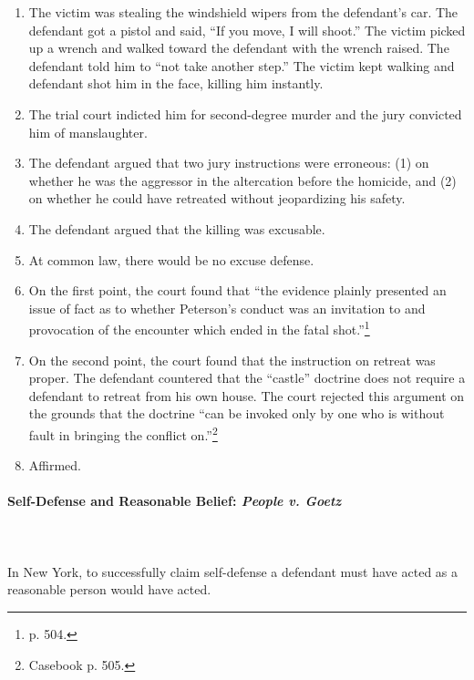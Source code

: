\begin{enumerate}
    \item The victim was stealing the windshield wipers from the defendant's 
    car. The defendant got a pistol and said, ``If you move, I will shoot.'' 
    The victim picked up a wrench and walked toward the defendant with the 
    wrench raised. The defendant told him to ``not take another step.'' The 
    victim kept walking and defendant shot him in the face, killing him 
    instantly.
    \item The trial court indicted him for second-degree murder and the jury 
    convicted him of manslaughter.
    \item The defendant argued that two jury instructions were erroneous: (1) 
    on whether he was the aggressor in the altercation before the homicide, and 
    (2) on whether he could have retreated without jeopardizing his safety.
    \item The defendant argued that the killing was excusable.
    \item At common law, there would be no excuse defense.
    \item On the first point, the court found that ``the evidence plainly 
    presented an issue of fact as to whether Peterson's conduct was an 
    invitation to and provocation of the encounter which ended in the fatal 
    shot.''\footnote{p. 504.}
    \item On the second point, the court found that the instruction on retreat 
    was proper. The defendant countered that the ``castle'' doctrine does not 
    require a defendant to retreat from his own house. The court rejected this 
    argument on the grounds that the doctrine ``can be invoked only by one who 
    is without fault in bringing the conflict on.''\footnote{Casebook p. 505.}
    \item Affirmed.
\end{enumerate}

\paragraph{Self-Defense and Reasonable Belief: \emph{People v. Goetz}}
~\\\\
In New York, to successfully claim self-defense a defendant must have acted as 
a reasonable person would have acted.

